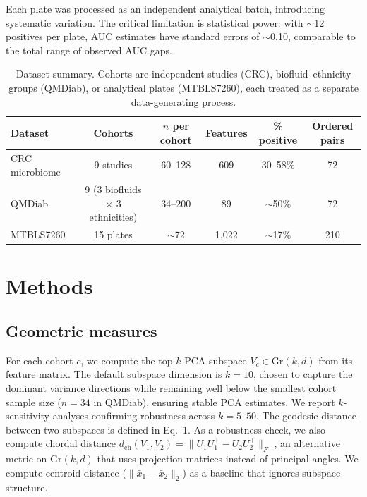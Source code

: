 \documentclass{article}
\begin{document}
Each plate was processed as an independent analytical batch, introducing systematic variation. The critical limitation is statistical power: with $\sim$12 positives per plate, AUC estimates have standard errors of $\sim$0.10, comparable to the total range of observed AUC gaps.

\begin{table}[t]
\centering
\caption{Dataset summary. Cohorts are independent studies (CRC), biofluid--ethnicity groups (QMDiab), or analytical plates (MTBLS7260), each treated as a separate data-generating process.}
\label{tab:cohorts}
\begin{tabular}{lccccc}
\toprule
Dataset & Cohorts & $n$ per cohort & Features & \% positive & Ordered pairs \\
\midrule
CRC microbiome & 9 studies & 60--128 & 609 & 30--58\% & 72 \\
QMDiab & 9 (3 biofluids $\times$ 3 ethnicities) & 34--200 & 89 & $\sim$50\% & 72 \\
MTBLS7260 & 15 plates & $\sim$72 & 1{,}022 & $\sim$17\% & 210 \\
\bottomrule
\end{tabular}
\end{table}


\section{Methods}
\label{sec:methods}

\subsection{Geometric measures}

For each cohort $c$, we compute the top-$k$ PCA subspace $V_c \in \mathrm{Gr}(k, d)$ from its feature matrix. The default subspace dimension is $k = 10$, chosen to capture the dominant variance directions while remaining well below the smallest cohort sample size ($n = 34$ in QMDiab), ensuring stable PCA estimates. We report $k$-sensitivity analyses confirming robustness across $k = 5$--$50$. The geodesic distance between two subspaces is defined in Eq.~1. As a robustness check, we also compute chordal distance $d_{\mathrm{ch}}(V_1, V_2) = \|U_1 U_1^\top - U_2 U_2^\top\|_F$ \citep{conway1996functions}, an alternative metric on $\mathrm{Gr}(k, d)$ that uses projection matrices instead of principal angles. We compute centroid distance ($\|\bar{x}_1 - \bar{x}_2\|_2$) as a baseline that ignores subspace structure.
\end{document}
